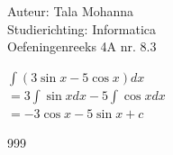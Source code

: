 \documentclass[a4paper]{article}
\newcommand{\dint}{\displaystyle\int}
\begin{document}
\noindent \large Auteur: Tala Mohanna\\
\noindent \large Studierichting: Informatica\\
\noindent \large Oefeningenreeks 4A nr. 8.3\\

\medskip

\normalsize

$\dint (3\sin x-5\cos x)dx$ \\

$=3\dint \sin xdx-5\dint \cos xdx$ \\

$=-3\cos x-5\sin x+c$ \\

\begin{thebibliography}{999}
\end{thebibliography}
\end{document}
